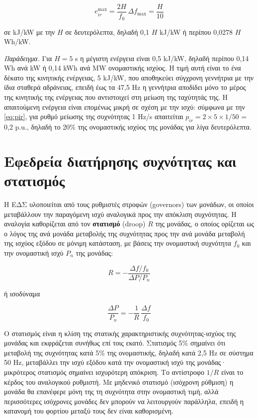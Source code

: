 \begin{equation}
e_{ir}^{\max} = \frac{2H}{f_0}\,\Delta f_{\max} = \frac{H}{10}
\label{eq:eir-max}
\end{equation}

σε kJ/kW με την $H$ σε δευτερόλεπτα, δηλαδή 0,1 $H$ kJ/kW ή περίπου 0,0278 $H$ Wh/kW.

\emph{Παράδειγμα.} Για $H = 5$ s η μέγιστη ενέργεια είναι 0,5 kJ/kW, δηλαδή περίπου 0,14 Wh
ανά kW ή 0,14 kWh ανά MW ονομαστικής ισχύος. Η τιμή αυτή είναι το ένα δέκατο της κινητικής
ενέργειας, 5 kJ/kW, που αποθηκεύει σύγχρονη γεννήτρια με την ίδια σταθερά αδράνειας, επειδή
έως τα 47,5 Hz η γεννήτρια αποδίδει μόνο το μέρος της κινητικής της ενέργειας που αντιστοιχεί
στη μείωση της ταχύτητάς της. Η απαιτούμενη ενέργεια είναι επομένως μικρή σε σχέση με την
ισχύ: σύμφωνα με την \eqref{eq:pir}, για ρυθμό μείωσης της συχνότητας 1 Hz/s απαιτείται
$p_{ir} = 2 \times 5 \times 1/50$ = 0,2 p.u., δηλαδή το 20\% της ονομαστικής ισχύος της
μονάδας για λίγα δευτερόλεπτα.

\section{Εφεδρεία διατήρησης συχνότητας και στατισμός}
\label{sec:fcr}

Η ΕΔΣ υλοποιείται από τους ρυθμιστές στροφών (governors) των μονάδων, οι οποίοι μεταβάλλουν
την παραγόμενη ισχύ αναλογικά προς την απόκλιση συχνότητας. Η αναλογία καθορίζεται από τον
\textbf{στατισμό} (droop) $R$ της μονάδας, ο οποίος ορίζεται ως ο λόγος της ανά μονάδα
μεταβολής της συχνότητας προς την ανά μονάδα μεταβολή της ισχύος εξόδου σε μόνιμη κατάσταση,
με βάσεις την ονομαστική συχνότητα $f_0$ και την ονομαστική ισχύ $P_n$ της μονάδας:

\begin{equation}
R = -\frac{\Delta f / f_0}{\Delta P / P_n}
\label{eq:droopdef}
\end{equation}

ή ισοδύναμα

\begin{equation}
\frac{\Delta P}{P_n} = -\frac{1}{R}\,\frac{\Delta f}{f_0}
\label{eq:droop}
\end{equation}

Ο στατισμός είναι η κλίση της στατικής χαρακτηριστικής συχνότητας-ισχύος της μονάδας και
εκφράζεται συνήθως επί τοις εκατό. Στατισμός 5\% σημαίνει ότι μεταβολή της συχνότητας κατά 5\%
της ονομαστικής, δηλαδή κατά 2,5 Hz σε σύστημα 50 Hz, μεταβάλλει την ισχύ εξόδου κατά την
ονομαστική ισχύ της μονάδας· μικρότερος στατισμός σημαίνει ισχυρότερη απόκριση. Το αντίστροφο
$1/R$ είναι το κέρδος του αναλογικού ρυθμιστή. Με μηδενικό στατισμό (ισόχρονη ρύθμιση) η
μονάδα θα επανέφερε μόνη της τη συχνότητα στην ονομαστική τιμή, αλλά περισσότερες ισόχρονες
μονάδες δεν μπορούν να λειτουργούν παράλληλα, επειδή η κατανομή του φορτίου μεταξύ τους δεν
είναι καθορισμένη.


